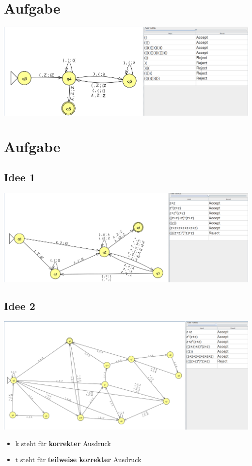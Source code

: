 \documentclass[a4paper,12pt,titlepage]{article}
\begin{document}
\section{Aufgabe}
\includegraphics[width=1.0\textwidth]{task4.png}\\
\section{Aufgabe}
\subsection{Idee 1}
\includegraphics[width=1.0\textwidth]{task5SolutionJan.png}\\
\subsection{Idee 2}
\includegraphics[width=1.0\textwidth]{task5SolutionJakob.png}\\
\begin{itemize}
\item k steht für \textbf{korrekter} Ausdruck
\item t steht für \textbf{teilweise korrekter} Ausdruck
\end{itemize}
\end{document}
